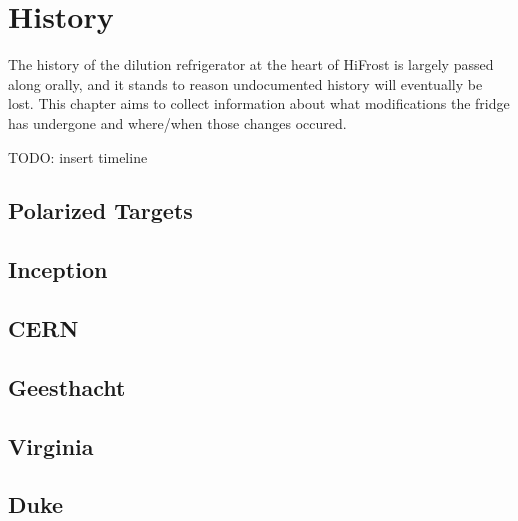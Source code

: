 \chapter{History} 
\label{history} 
The history of the dilution refrigerator at the heart of HiFrost is largely passed along orally, and it stands to reason undocumented history will eventually be lost.  This chapter aims to collect information about what modifications the fridge has undergone and where/when those changes occured. 

TODO: insert timeline 
\section{Polarized Targets}

\section{Inception}  
 
\section{CERN} 
 
\section{Geesthacht} 

\section{Virginia}

\section{Duke}
